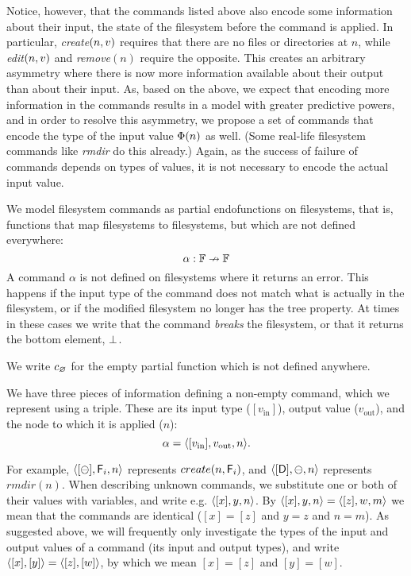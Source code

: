 Notice, however, that the commands listed above also encode some information about 
their input, the state of the filesystem
before the command is applied. In particular, \textit{create}$(n,v)$ requires that there are no files
or directories at $n$, while \textit{edit}$(n,v)$ and \textit{remove}$(n)$ require the opposite.
This creates an arbitrary asymmetry where
there is now more information available about their output than about their input.
As, based on the above, we expect that encoding more information in the commands
results in a model with greater predictive powers,
and in order to resolve this asymmetry, 
we propose a set of commands that encode
the type of the input value $\Phi(n)$ as well.
(Some real-life filesystem commands like \textit{rmdir} do this already.)
Again, as the success of failure of commands depends on types of values,
it is not necessary to encode the actual input value.


\begin{mydef}
We model filesystem commands as partial endofunctions on filesystems,
that is, functions that map filesystems to filesystems, but which
are not defined everywhere:
\[ \alpha: \mathbb{F} \nrightarrow \mathbb{F} \]
A command $\alpha$ is not defined on filesystems where it returns an error.
This happens if the input type of the command does not match
what is actually in the filesystem, or if the modified filesystem no
longer has the tree property.
At times in these cases we write that the command {\em breaks} the filesystem,
or that it returns the bottom element, $\bot$.

We write $c_\varnothing$ for the empty partial function which is not defined anywhere.

We have three pieces of information defining a non-empty command,
which we represent using a triple. These are its
input type ($[v_\textrm{in}]$), output value ($v_\textrm{out}$),
and the node to which it is applied ($n$):
\[ \alpha = \langle{[v_\textrm{in}],v_\textrm{out},n}\rangle. \]
\end{mydef}

For example, $\langle{[\ominus],\mathsf{F}_i,n}\rangle$ represents $create(n,\mathsf{F}_i)$,
and $\langle{[\mathsf{D}],\ominus,n}\rangle$ represents $rmdir(n)$.
When describing unknown commands, we substitute one or both
of their values with variables, and write e.g. $\langle{[x],y,n}\rangle$.
By $\langle{[x],y,n}\rangle=\langle{[z],w,m}\rangle$ we mean that the commands are identical
($[x]=[z]$ and $y=z$ and $n=m$).
As suggested above, we will frequently only investigate
the types of the input and output values of a command
(its input and output types), and write
$\langle{[x],[y]}\rangle=\langle{[z],[w]}\rangle$, by which we mean $[x]=[z]$ and $[y]=[w]$.

